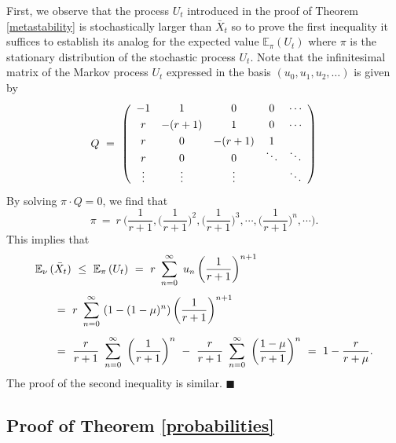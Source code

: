 \indent First, we observe that the process $U_t$ introduced in the proof of Theorem \ref{metastability} is stochastically
 larger than $\bar X_t$ so to prove the first inequality it suffices to establish its analog for the expected value ${\mathbb{E}}_{\pi} (U_t)$
 where $\pi$ is the stationary distribution of the stochastic process $U_t$.
 Note that the infinitesimal matrix of the Markov process $U_t$ expressed in the basis $(u_0, u_1, u_2, \ldots)$ is given by
 $$ Q \ = \ \left(\begin{array}{ccccc}
  - 1 &      1      & 0         & 0         & \cdots \vspace{3pt} \\
    r &   - (r + 1) & 1         & 0         & \cdots \vspace{3pt} \\
    r &      0      & - (r + 1) & 1         &        \vspace{-3pt} \\
    r &      0      & 0         & \ddots    & \ddots \\
   \vdots & \vdots  & \vdots    &           & \ddots \end{array} \right) $$
 By solving $\pi \cdot Q = 0$, we find that
 $$ \pi \ = \ r \ \bigg(\frac{1}{r + 1}, \bigg(\frac{1}{r + 1} \bigg)^2, \bigg(\frac{1}{r + 1} \bigg)^3, \cdots, \bigg(\frac{1}{r + 1} \bigg)^n, \cdots \bigg). $$
 This implies that
 $$ \begin{array}{l}
    {\mathbb{E}}_{\nu} \,(\bar X_t) \ \leq \ {\mathbb{E}}_{\pi} \,(U_t) \ = \
    \displaystyle r \ \sum_{n = 0}^{\infty} \ u_n \,\bigg(\frac{1}{r + 1} \bigg)^{n + 1} \vspace{8pt} \\ \hspace{20pt} = \
    \displaystyle r \ \sum_{n = 0}^{\infty} \ (1 - (1 - \mu)^n) \,\bigg(\frac{1}{r + 1} \bigg)^{n + 1} \vspace{8pt} \\ \hspace{20pt} = \
    \displaystyle \frac{r}{r + 1} \ \sum_{n = 0}^{\infty} \ \bigg(\frac{1}{r + 1} \bigg)^n \ - \
    \displaystyle \frac{r}{r + 1} \ \sum_{n = 0}^{\infty} \ \bigg(\frac{1 - \mu}{r + 1} \bigg)^n \ = \
    \displaystyle 1 - \frac{r}{r + \mu}. \end{array} $$
 The proof of the second inequality is similar. \hspace{2mm} $\blacksquare$

\subsection*{Proof of Theorem \ref{probabilities}}

